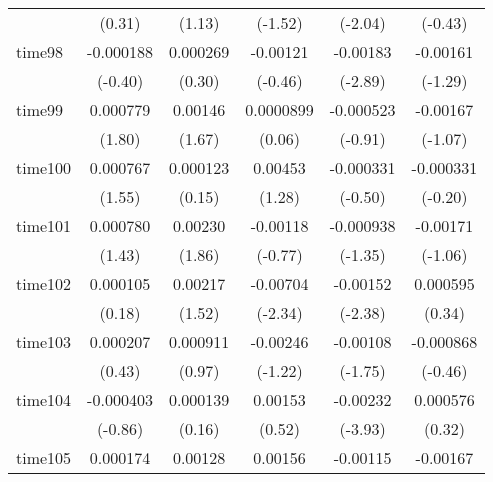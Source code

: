 \begin{table}[htbp]
\begin{tabular}{l*{5}{c}}
            &      (0.31)         &      (1.13)         &     (-1.52)         &     (-2.04)         &     (-0.43)         \\
time98      &   -0.000188         &    0.000269         &    -0.00121         &    -0.00183\sym{**} &    -0.00161         \\
            &     (-0.40)         &      (0.30)         &     (-0.46)         &     (-2.89)         &     (-1.29)         \\
time99      &    0.000779         &     0.00146         &   0.0000899         &   -0.000523         &    -0.00167         \\
            &      (1.80)         &      (1.67)         &      (0.06)         &     (-0.91)         &     (-1.07)         \\
time100     &    0.000767         &    0.000123         &     0.00453         &   -0.000331         &   -0.000331         \\
            &      (1.55)         &      (0.15)         &      (1.28)         &     (-0.50)         &     (-0.20)         \\
time101     &    0.000780         &     0.00230         &    -0.00118         &   -0.000938         &    -0.00171         \\
            &      (1.43)         &      (1.86)         &     (-0.77)         &     (-1.35)         &     (-1.06)         \\
time102     &    0.000105         &     0.00217         &    -0.00704\sym{*}  &    -0.00152\sym{*}  &    0.000595         \\
            &      (0.18)         &      (1.52)         &     (-2.34)         &     (-2.38)         &      (0.34)         \\
time103     &    0.000207         &    0.000911         &    -0.00246         &    -0.00108         &   -0.000868         \\
            &      (0.43)         &      (0.97)         &     (-1.22)         &     (-1.75)         &     (-0.46)         \\
time104     &   -0.000403         &    0.000139         &     0.00153         &    -0.00232\sym{***}&    0.000576         \\
            &     (-0.86)         &      (0.16)         &      (0.52)         &     (-3.93)         &      (0.32)         \\
time105     &    0.000174         &     0.00128         &     0.00156         &    -0.00115         &    -0.00167         \\

\end{tabular}
\end{table}
